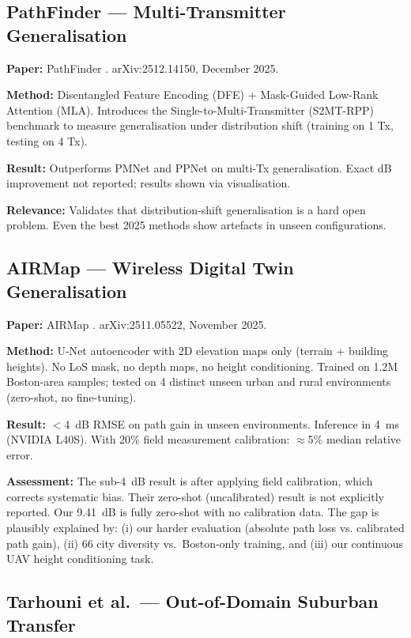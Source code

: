 \documentclass[11pt,a4paper]{article}
\begin{document}
\subsection{PathFinder --- Multi-Transmitter Generalisation}

\textbf{Paper:} PathFinder \cite{pathfinder2025}. arXiv:2512.14150, December 2025.

\textbf{Method:} Disentangled Feature Encoding (DFE) + Mask-Guided Low-Rank Attention
(MLA). Introduces the Single-to-Multi-Transmitter (S2MT-RPP) benchmark to measure
generalisation under distribution shift (training on 1 Tx, testing on 4 Tx).

\textbf{Result:} Outperforms PMNet and PPNet on multi-Tx generalisation.
Exact dB improvement not reported; results shown via visualisation.

\textbf{Relevance:} Validates that distribution-shift generalisation is a hard
open problem. Even the best 2025 methods show artefacts in unseen configurations.

\subsection{AIRMap --- Wireless Digital Twin Generalisation}

\textbf{Paper:} AIRMap \cite{airmap2025}. arXiv:2511.05522, November 2025.

\textbf{Method:} U-Net autoencoder with 2D elevation maps only (terrain + building
heights). No LoS mask, no depth maps, no height conditioning.
Trained on 1.2M Boston-area samples; tested on 4 distinct unseen urban and
rural environments (zero-shot, no fine-tuning).

\textbf{Result:} $< 4$~dB RMSE on path gain in unseen environments. Inference
in 4~ms (NVIDIA L40S). With 20\% field measurement calibration: $\approx$5\%
median relative error.

\textbf{Assessment:} The sub-4~dB result is after applying field calibration,
which corrects systematic bias. Their zero-shot (uncalibrated) result is not
explicitly reported. Our 9.41~dB is fully zero-shot with no calibration data.
The gap is plausibly explained by: (i) our harder evaluation (absolute path loss vs.
calibrated path gain), (ii) 66 city diversity vs.\ Boston-only training, and
(iii) our continuous UAV height conditioning task.

\subsection{Tarhouni et al.\ --- Out-of-Domain Suburban Transfer}
\end{document}
